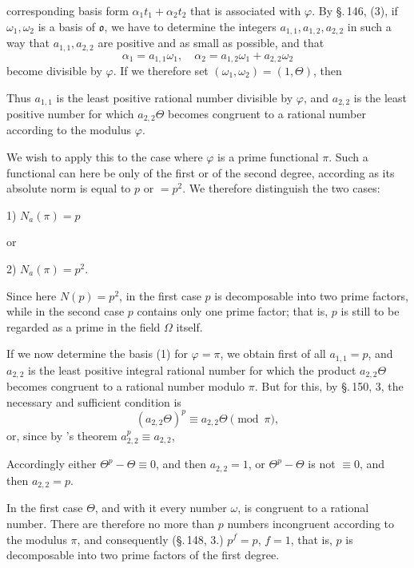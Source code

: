 corresponding basis form $\alpha_1 t_1 + \alpha_2 t_2$ that is associated with $\varphi$. By \S.\,146, (3), if $\omega_1, \omega_2$ is a basis of $\mathfrak{o}$, we have to determine the integers $a_{1,1}, a_{1,2}, a_{2,2}$ in such a way that $a_{1,1}, a_{2,2}$ are positive and as small as possible, and that
\[ \alpha_1 = a_{1,1}\omega_1, \quad \alpha_2 = a_{1,2}\omega_1 + a_{2,2}\omega_2 \]
become divisible by $\varphi$. If we therefore set $(\omega_1, \omega_2) = (1, \Theta)$, then


Thus $a_{1,1}$ is the least positive rational number divisible by $\varphi$, and $a_{2,2}$ is the least positive number for which $a_{2,2}\Theta$ becomes congruent to a rational number according to the modulus $\varphi$.

We wish to apply this to the case where $\varphi$ is a prime functional $\pi$. Such a functional can here be only of the first or of the second degree, according as its absolute norm is equal to $p$ or $=p^2$. We therefore distinguish the two cases:

1) \quad $N_a(\pi) = p$

or

2) \quad $N_a(\pi) = p^2.$

Since here $N(p) = p^2$, in the first case $p$ is decomposable into two prime factors, while in the second case $p$ contains only one prime factor; that is, $p$ is still to be regarded as a prime in the field $\Omega$ itself.

If we now determine the basis (1) for $\varphi = \pi$, we obtain first of all $a_{1,1} = p$, and $a_{2,2}$ is the least positive integral rational number for which the product $a_{2,2}\Theta$ becomes congruent to a rational number modulo $\pi$. But for this, by \S.\,150, 3, the necessary and sufficient condition is
\[ (a_{2,2}\Theta)^p \equiv a_{2,2}\Theta \pmod{\pi}, \]
or, since by 's theorem $a_{2,2}^p \equiv a_{2,2}$,


Accordingly either $\Theta^p - \Theta \equiv 0$, and then $a_{2,2} = 1$, or $\Theta^p - \Theta$ is not $\equiv 0$, and then $a_{2,2} = p$.

In the first case $\Theta$, and with it every number $\omega$, is congruent to a rational number. There are therefore no more than $p$ numbers incongruent according to the modulus $\pi$, and consequently (\S.\,148, 3.) $p^f = p$, $f = 1$, that is, $p$ is decomposable into two prime factors of the first degree.
